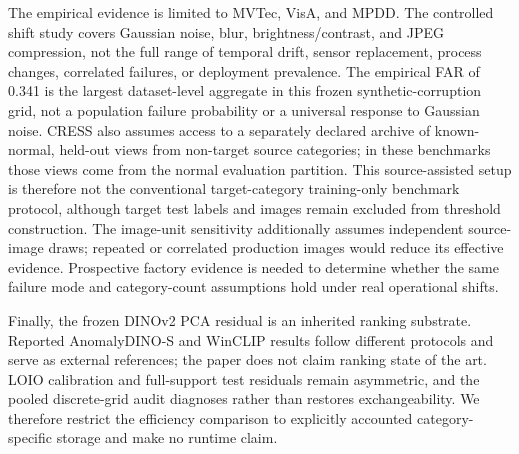 The empirical evidence is limited to MVTec, VisA, and MPDD\@. The controlled shift study covers Gaussian noise, blur, brightness/contrast, and JPEG compression, not the full range of temporal drift, sensor replacement, process changes, correlated failures, or deployment prevalence. The empirical FAR of 0.341 is the largest dataset-level aggregate in this frozen synthetic-corruption grid, not a population failure probability or a universal response to Gaussian noise. CRESS also assumes access to a separately declared archive of known-normal, held-out views from non-target source categories; in these benchmarks those views come from the normal evaluation partition. This source-assisted setup is therefore not the conventional target-category training-only benchmark protocol, although target test labels and images remain excluded from threshold construction. The image-unit sensitivity additionally assumes independent source-image draws; repeated or correlated production images would reduce its effective evidence. Prospective factory evidence is needed to determine whether the same failure mode and category-count assumptions hold under real operational shifts.

Finally, the frozen DINOv2 PCA residual is an inherited ranking substrate. Reported AnomalyDINO-S and WinCLIP results follow different protocols and serve as external references; the paper does not claim ranking state of the art. LOIO calibration and full-support test residuals remain asymmetric, and the pooled discrete-grid audit diagnoses rather than restores exchangeability. We therefore restrict the efficiency comparison to explicitly accounted category-specific storage and make no runtime claim.
